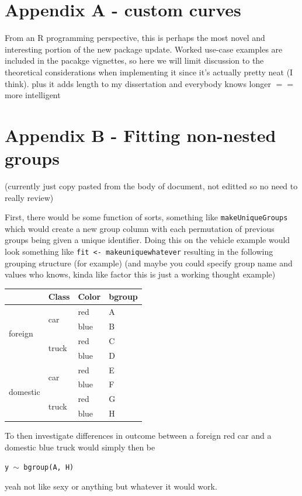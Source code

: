 \documentclass{article}
\newcommand{\xt}{\texttt}%
\begin{document}
\appendix

\section*{Appendix A - custom curves}

From an R programming perspective, this is perhaps the most novel and interesting portion of the new package update. Worked use-case examples are included in the pacakge vignettes, so here we will limit discussion to the theoretical considerations when implementing it since it's actually pretty neat (I think). plus it adds length to my dissertation and everybody knows longer $==$ more intelligent

\section*{Appendix B - Fitting non-nested groups}

(currently just copy pasted from the body of document, not editted so no need to really review)

First, there would be some function of sorts, something like \xt{makeUniqueGroups} which would create a new group column with each permutation of previous groups being given a unique identifier. Doing this on the vehicle example would look something like \xt{fit <- makeuniquewhatever} resulting in the following grouping structure (for example) (and maybe you could specify group name and values who knows, kinda like factor this is just a working thought example)

\begin{center}

\begin{tabular}{|p{0.9in}|p{0.9in}|p{0.9in}|p{0.5in}|} \hline 
\rowcolor{lightgray} \multicolumn{1}{|c|}{Origin} & \multicolumn{1}{c|}{Class} & \multicolumn{1}{c|}{Color} & \multicolumn{1}{c|}{bgroup}\\
\hline
\multirow{4}{*}{foreign} & \multirow{2}{*}{car} & red & A\\
\hhline{~~--}
& & blue & B \\
\hhline{~---}
& \multirow{2}{*}{truck} & red & C\\
\hhline{~~--}
& & blue & D\\
\hline
\multirow{4}{*}{domestic} & \multirow{2}{*}{car} & red & E \\
\hhline{~~--}
& & blue & F\\
\hhline{~---}
& \multirow{2}{*}{truck} & red & G\\
\hhline{~~--}
& & blue & H\\
\hline
\end{tabular}
\end{center}

To then investigate differences in outcome between a foreign red car and a domestic blue truck would simply then be

\begin{center}
\tt y $\sim$ bgroup(A, H)
\end{center}

yeah not like sexy or anything but whatever it would work.
\end{document}
